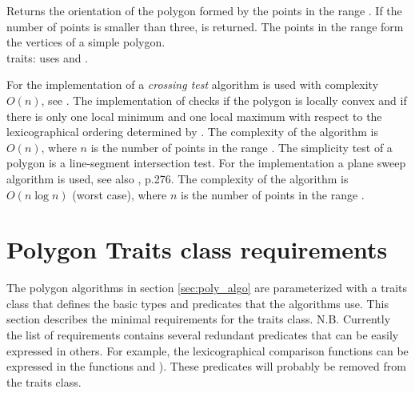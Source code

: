 {\samepage
{}
{
Returns the orientation of the polygon formed by the points in the range
\ccStyle{[first,last)}. 
If the number of points is smaller than three,  is
returned.
\ccPrecond The points in the range \ccStyle{[first,last)}
form the vertices of a simple polygon.\\
{\sc traits}: uses  and .
}
}

\ccImplementation
For the implementation of  
a {\em crossing test} algorithm is used with complexity
$O(n)$, see \cite{h-pps-94}.
The implementation of  checks if the polygon is locally convex
and if there is only one local minimum and one local maximum with respect to
the lexicographical ordering determined by
.
The complexity of the algorithm is $O(n)$, where $n$ is the number of points
in the range \ccStyle{[first,last)}.
The simplicity test  of a polygon is a line-segment 
intersection test. For the implementation a plane sweep algorithm is used, see also 
\cite{ps-cgi-85}, p.276.
The complexity of the algorithm is $O(n \log n)$ (worst case), where $n$ is 
the number of points in the range \ccStyle{[first,last)}.


\section{Polygon Traits class requirements}

The polygon algorithms in section \ref{sec:poly_algo} are parameterized with
a traits class  that defines the basic types and predicates
that the algorithms use. This section describes the minimal requirements for
the traits class. N.B. Currently the list of requirements contains several
redundant predicates that can be easily expressed in others. For example,
the lexicographical comparison functions can be expressed in the functions
 and ). These predicates will probably
be removed from the traits class.

